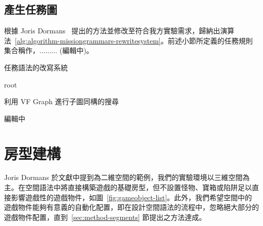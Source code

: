 \subsection{產生任務圖}
\label{ssec:method-missiongrammars-graph}

根據 Joris Dormans~\cite{dormans2010adventures} 提出的方法並修改至符合我方實驗需求，歸納出演算法~\ref{alg:algorithm-missiongrammars-rewritesystem}。前述小節所定義的任務規則集合稱作，......... (編輯中)。

\begin{algorithm}
    \caption{任務語法的改寫系統}
    \label{alg:algorithm-missiongrammars-rewritesystem}
    \begin{algorithmic}
        \ENDIF
        \ENDFOR
        \RETURN root
    \end{algorithmic}
\end{algorithm}

\begin{algorithm}
    \caption{利用 VF Graph 進行子圖同構的搜尋}
    \label{alg:algorithm-missiongrammars-rewritesystem-findmatchs}
    \begin{algorithmic}
        \RETURN 編輯中
    \end{algorithmic}
\end{algorithm}

\section{房型建構}
\label{sec:method-spacepieces}

Joris Dormans 於文獻中提到為二維空間的範例，我們的實驗環境以三維空間為主。在空間語法中將直接構築遊戲的基礎房型，但不設置怪物、寶箱或陷阱足以直接影響遊戲性的遊戲物件，如圖~\ref{fig:gameobject-list}。此外，我們希望空間中的遊戲物件能夠有意義的自動化配置，即在設計空間語法的流程中，忽略絕大部分的遊戲物件配置，直到~\ref{sec:method-segments} 節提出之方法達成。

